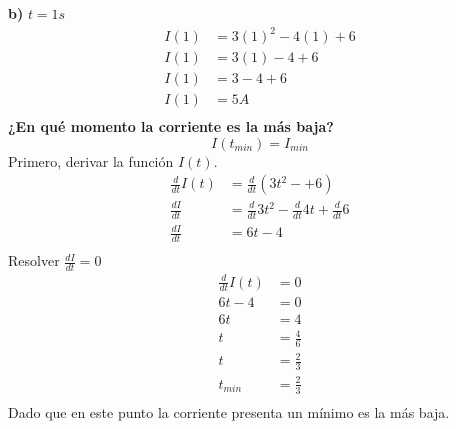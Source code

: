 \textbf{b)} $t = 1 s$
\begin{align*}
    I(1) &= 3(1)^{2} - 4(1) +6\\
    I(1) &= 3(1) - 4 +6\\
    I(1) &= 3 - 4 +6\\
    I(1) &= 5 A\\
\end{align*}
\textbf{¿En qué momento la corriente es la más baja?}
\[
I(t_{min}) = I_{min}
\]
Primero, derivar la función $I(t)$.
\begin{align*}
    \frac{d}{dt}I(t) &= \frac{d}{dt}(3t^{2} -  +6)\\
    \frac{dI}{dt} &= \frac{d}{dt}3t^{2} - \frac{d}{dt}4t + \frac{d}{dt}6\\
    \frac{dI}{dt} &= 6t -4\\
\end{align*}
Resolver $\frac{dI}{dt} = 0$
\begin{align*}
    \frac{d}{dt}I(t) &= 0\\
    6t -4 &= 0\\
    6t &= 4\\
    t &= \frac{4}{6}\\
    t &= \frac{2}{3}\\
    t_{min} &= \frac{2}{3}\\
\end{align*}
Dado que en este punto la corriente presenta un mínimo es la más baja.